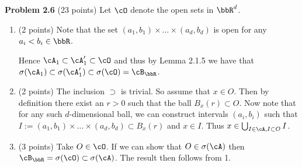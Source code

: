 
\textbf{Problem 2.6} (23 points)
Let $\cO$ denote the open sets in $\bbR^d$.
\begin{enumerate}[label=(\alph*)]
\item (2 points) Note that the set $(a_1,b_1) \times \dots \times (a_d, b_d)$ is open for any $a_i < b_i \in \bbR$.

 Hence $\cA_1 \subset \cA_1^\prime \subset \cO$ and thus by Lemma 2.1.5 we have that $\sigma(\cA_1) \subset \sigma(\cA_1^\prime) \subset \sigma(\cO) = \cB_\bbR$.
\item (2 points) The inclusion $\supset$ is trivial. So assume that $x \in O$. Then by definition there exist an $r > 0$ such that the ball $B_x(r) \subset O$. Now note that for any such $d$-dimensional ball, we can construct intervals $(a_i,b_i)$ such that $I := (a_1,b_1) \times \dots \times (a_d, b_d) \subset B_x(r)$ and $x \in I$. Thus $x \in \bigcup_{I \in \cA, I \subset O} I$.
\item (3 points) Take $O \in \cO$. If we can show that $O \in \sigma(\cA)$ then $\cB_\bbR = \sigma(\cO) \subset \sigma(\cA)$. The result then follows from 1. 


\end{enumerate}
